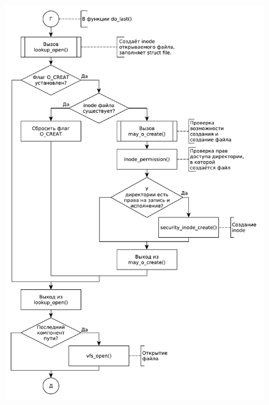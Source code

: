 \documentclass[a4paper,oneside,12pt]{extreport}
\begin{document}
\begin{figure}[H]
	\centering
	\includegraphics[scale=0.70]{inc/img/open5}
\end{figure}
\end{document}
